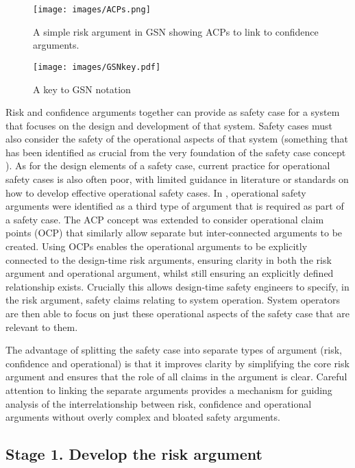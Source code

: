 \begin{figure*}
\centering
\texttt{[image: images/ACPs.png]}
\caption{A simple risk argument in GSN showing ACPs to link to confidence arguments.}
\label{fig:acp}
\end{figure*}

\begin{figure*}
\centering
\texttt{[image: images/GSNkey.pdf]}
\caption{A key to GSN notation}
\label{fig:GSNkey}
\end{figure*}

Risk and confidence arguments together can provide as safety case for a system that focuses on the design and development of that system. Safety cases must also consider the safety of the operational aspects of that system (something that has been identified as crucial from the very foundation of the safety case concept \cite{cullen1993public}). As for the design elements of a safety case, current practice for operational safety cases is also often poor, with limited guidance in literature or standards on how to develop effective operational safety cases. In \cite{fenn2024new}, operational safety arguments were identified as a third type of argument that is required as part of a safety case. The ACP concept was extended to consider operational claim points (OCP) that similarly allow separate but inter-connected arguments to be created. Using OCPs enables the operational arguments to be explicitly connected to the
design-time risk arguments, ensuring clarity in both the risk argument and operational argument, whilst still ensuring an explicitly defined relationship exists. Crucially this allows design-time safety engineers to specify, in the risk argument, safety
claims relating to system operation. System operators are then able to focus on just these operational aspects of the safety case that are relevant to them.

The advantage of splitting the safety case into separate types of argument (risk, confidence and operational) is that it improves clarity by simplifying the core risk argument and ensures that the role of all claims in the argument is clear. Careful attention to linking the separate arguments provides a mechanism for guiding analysis
of the interrelationship between risk, confidence and operational arguments without overly
complex and bloated safety arguments.

\subsection{Stage 1. Develop the risk argument}

